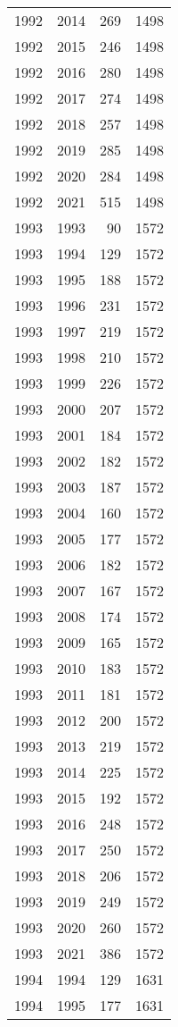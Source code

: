 \documentclass[
  11pt,
  letterpaper,
  DIV=11,
  numbers=noendperiod,
  twoside]{scrartcl}
\begin{document}
\begin{longtable}[]{@{}rrrr@{}}
1992 & 2014 & 269 & 1498 \\
1992 & 2015 & 246 & 1498 \\
1992 & 2016 & 280 & 1498 \\
1992 & 2017 & 274 & 1498 \\
1992 & 2018 & 257 & 1498 \\
1992 & 2019 & 285 & 1498 \\
1992 & 2020 & 284 & 1498 \\
1992 & 2021 & 515 & 1498 \\
1993 & 1993 & 90 & 1572 \\
1993 & 1994 & 129 & 1572 \\
1993 & 1995 & 188 & 1572 \\
1993 & 1996 & 231 & 1572 \\
1993 & 1997 & 219 & 1572 \\
1993 & 1998 & 210 & 1572 \\
1993 & 1999 & 226 & 1572 \\
1993 & 2000 & 207 & 1572 \\
1993 & 2001 & 184 & 1572 \\
1993 & 2002 & 182 & 1572 \\
1993 & 2003 & 187 & 1572 \\
1993 & 2004 & 160 & 1572 \\
1993 & 2005 & 177 & 1572 \\
1993 & 2006 & 182 & 1572 \\
1993 & 2007 & 167 & 1572 \\
1993 & 2008 & 174 & 1572 \\
1993 & 2009 & 165 & 1572 \\
1993 & 2010 & 183 & 1572 \\
1993 & 2011 & 181 & 1572 \\
1993 & 2012 & 200 & 1572 \\
1993 & 2013 & 219 & 1572 \\
1993 & 2014 & 225 & 1572 \\
1993 & 2015 & 192 & 1572 \\
1993 & 2016 & 248 & 1572 \\
1993 & 2017 & 250 & 1572 \\
1993 & 2018 & 206 & 1572 \\
1993 & 2019 & 249 & 1572 \\
1993 & 2020 & 260 & 1572 \\
1993 & 2021 & 386 & 1572 \\
1994 & 1994 & 129 & 1631 \\
1994 & 1995 & 177 & 1631 \\

\end{longtable}
\end{document}
